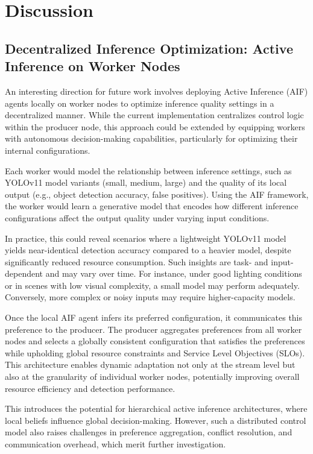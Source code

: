 \chapter{Discussion}
\section{Decentralized Inference Optimization: Active Inference on Worker Nodes}
An interesting direction for future work involves deploying Active Inference (AIF) agents locally on worker nodes to optimize inference quality settings in a decentralized manner. While the current implementation centralizes control logic within the producer node, this approach could be extended by equipping workers with autonomous decision-making capabilities, particularly for optimizing their internal configurations.

Each worker would model the relationship between inference settings, such as YOLOv11 model variants (small, medium, large) and the quality of its local output (e.g., object detection accuracy, false positives). Using the AIF framework, the worker would learn a generative model that encodes how different inference configurations affect the output quality under varying input conditions.

In practice, this could reveal scenarios where a lightweight YOLOv11 model yields near-identical detection accuracy compared to a heavier model, despite significantly reduced resource consumption. Such insights are task- and input-dependent and may vary over time. For instance, under good lighting conditions or in scenes with low visual complexity, a small model may perform adequately. Conversely, more complex or noisy inputs may require higher-capacity models.

Once the local AIF agent infers its preferred configuration, it communicates this preference to the producer. The producer aggregates preferences from all worker nodes and selects a globally consistent configuration that satisfies the preferences while upholding global resource constraints and Service Level Objectives (SLOs). This architecture enables dynamic adaptation not only at the stream level but also at the granularity of individual worker nodes, potentially improving overall resource efficiency and detection performance.

This introduces the potential for hierarchical active inference architectures, where local beliefs influence global decision-making. However, such a distributed control model also raises challenges in preference aggregation, conflict resolution, and communication overhead, which merit further investigation.


